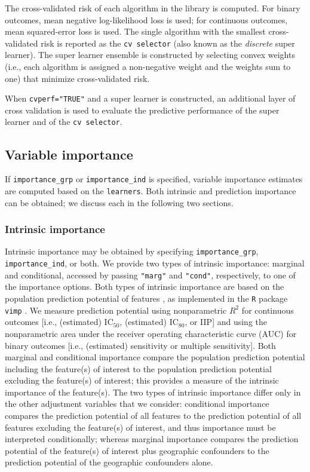 \documentclass[]{article}
\begin{document}
The cross-validated risk of each algorithm in the library is computed.
For binary outcomes, mean negative log-likelihood loss is used; for
continuous outcomes, mean squared-error loss is used. The single
algorithm with the smallest cross-validated risk is reported as the
\texttt{cv\ selector} (also known as the \emph{discrete} super learner).
The super learner ensemble is constructed by selecting convex weights
(i.e., each algorithm is assigned a non-negative weight and the weights
sum to one) that minimize cross-validated risk.

When \texttt{cvperf="TRUE"} and a super learner is constructed, an
additional layer of cross validation is used to evaluate the predictive
performance of the super learner and of the \texttt{cv\ selector}.

\subsection{Variable importance}\label{variable-importance}

If \texttt{importance\_grp} or \texttt{importance\_ind} is specified,
variable importance estimates are computed based on the
\texttt{learners}. Both intrinsic and prediction importance can be
obtained; we discuss each in the following two sections.

\subsubsection{Intrinsic importance}\label{sec:biolimp}

Intrinsic importance may be obtained by specifying
\texttt{importance\_grp}, \texttt{importance\_ind}, or both. We provide
two types of intrinsic importance: marginal and conditional, accessed by
passing \texttt{"marg"} and \texttt{"cond"}, respectively, to one of the
importance options. Both types of intrinsic importance are based on the
population prediction potential of features \citep{williamson2020}, as
implemented in the \texttt{R} package \texttt{vimp} \citep{vimppkg}. We
measure prediction potential using nonparametric \(R^2\) for continuous
outcomes {[}i.e., (estimated) IC\(_{50}\), (estimated) IC\(_{80}\), or
IIP{]} and using the nonparametric area under the receiver operating
characteristic curve (AUC) for binary outcomes {[}i.e., (estimated)
sensitivity or multiple sensitivity{]}. Both marginal and conditional
importance compare the population prediction potential including the
feature(s) of interest to the population prediction potential excluding
the feature(s) of interest; this provides a measure of the intrinsic
importance of the feature(s). The two types of intrinsic importance
differ only in the other adjustment variables that we consider:
conditional importance compares the prediction potential of all features
to the prediction potential of all features excluding the feature(s) of
interest, and thus importance must be interpreted conditionally; whereas
marginal importance compares the prediction potential of the feature(s)
of interest plus geographic confounders to the prediction potential of
the geographic confounders alone.
\end{document}
